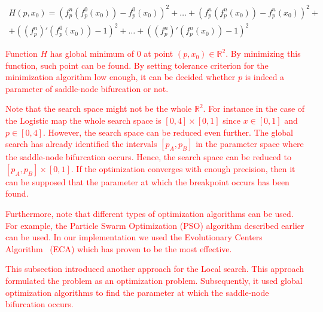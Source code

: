 \begin{multline*} 
H(p, x_0) = (f_{p}^{n}(f_{p}^{0}(x_0)) - f_{p}^{0}(x_0))^2 + \dots + (f_{p}^{n}(f_{p}^{n}(x_0)) - f_{p}^{n}(x_0))^2 + \\
    + ((f_{p}^{n})'(f_{p}^{0}(x_0)) -1)^2 + \dots + ((f_{p}^{n})'(f_{p}^{n}(x_0)) -1)^2
\end{multline*}

\textcolor{red}{
Function $H$ has global minimum of $0$ at point $(p, x_0) \in \mathbb{R}^{2}$.
By minimizing this function, such point can be found.
By setting tolerance criterion for the minimization algorithm low enough, it can be decided whether $p$ is indeed a parameter of saddle-node bifurcation or not.
}
\par
\textcolor{red}{
Note that the search space might not be the whole $\mathbb{R}^{2}$.
For instance in the case of the Logistic map the whole search space is $[0, 4] \times [0, 1]$ since $x \in [0,1]$ and $p \in [0,4]$.
However, the search space can be reduced even further.
The global search has already identified the intervals $[p_A, p_B]$ in the parameter space where the saddle-node bifurcation occurs.
Hence, the search space can be reduced to $[p_A, p_B] \times [0, 1]$.
If the optimization converges with enough precision, then it can be supposed that the parameter at which the breakpoint occurs has been found.
}
\par
\textcolor{red}{
Furthermore, note that different types of optimization algorithms can be used.
For example, the Particle Swarm Optimization (PSO) algorithm described earlier can be used.
In our implementation we used the Evolutionary Centers Algorithm~\cite{MejiadeDios20190913} (ECA)  which has proven to be the most effective.
}
\par
\textcolor{red}{
This subsection introduced another approach for the Local search.
This approach formulated the problem as an optimization problem.
Subsequently, it used global optimization algorithms to find the parameter at which the saddle-node bifurcation occurs.
}

